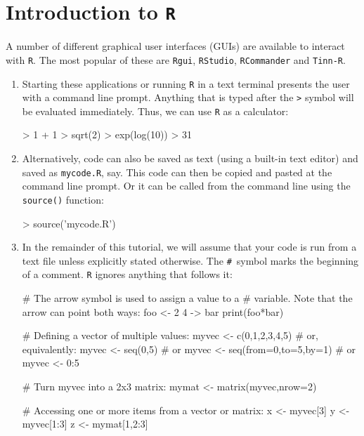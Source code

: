 \section{Introduction to \texttt{R}}
\label{sec:R}

A number of different graphical user interfaces (GUIs) are available
to interact with \texttt{R}. The most popular of these are
\texttt{Rgui}, \texttt{RStudio}, \texttt{RCommander} and
\texttt{Tinn-R}.

\begin{enumerate}
  \item Starting these applications or running \texttt{R} in a text
    terminal presents the user with a command line prompt. Anything
    that is typed after the \texttt{>} symbol will be evaluated
    immediately. Thus, we can use \texttt{R} as a calculator:

\begin{console}
> 1 + 1
> sqrt(2)
> exp(log(10))
> 31 %
\end{console}

\item Alternatively, code can also be saved as text (using a built-in text
  editor) and saved as \texttt{mycode.R}, say. This code can then be
  copied and pasted at the command line prompt. Or it can be called from
  the command line using the \texttt{source()} function:

\begin{console}
> source('mycode.R')
\end{console}

\item In the remainder of this tutorial, we will assume that your code is
  run from a text file unless explicitly stated otherwise. The
  \texttt{\#}~symbol marks the beginning of a comment.  \texttt{R}
  ignores anything that follows it:

\begin{script}
# The arrow symbol is used to assign a value to a
# variable. Note that the arrow can point both ways:
foo <- 2
4 -> bar
print(foo*bar)

# Defining a vector of multiple values:
myvec <- c(0,1,2,3,4,5)
# or, equivalently:
myvec <- seq(0,5)
# or
myvec <- seq(from=0,to=5,by=1)
# or
myvec <- 0:5

# Turn myvec into a 2x3 matrix:
mymat <- matrix(myvec,nrow=2)

# Accessing one or more items from a vector or matrix:
x <- myvec[3]
y <- myvec[1:3]
z <- mymat[1,2:3]


\end{script}
\end{enumerate}
